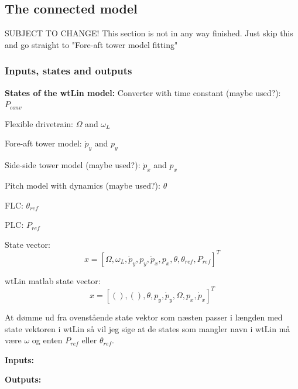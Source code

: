 %	


\subsection{The connected model}
SUBJECT TO CHANGE! This section is not in any way finished. Just skip this and go straight to "Fore-aft tower model fitting"

\subsubsection{Inputs, states and outputs}
\textbf{States of the wtLin model:}
Converter with time constant (maybe used?): $ P_{conv} $

Flexible drivetrain: $ \Omega $ and $ \omega_L $

Fore-aft tower model: $ \dot{p}_y $ and $ p_y $

Side-side tower model (maybe used?): $ \dot{p}_x $ and $ p_x $

Pitch model with dynamics (maybe used?): $ \theta $

FLC: $ \theta_{ref} $

PLC: $ P_{ref} $

State vector: 
\begin{equation}\label{key}
	x = [\Omega, \omega_L, \dot{p}_y, p_y, \dot{p}_x, p_x, \theta, \theta_{ref}, P_{ref}]^T
\end{equation}

wtLin matlab state vector:
\begin{equation}\label{key}
	x = [(), (), \theta, p_y, \dot{p}_y, \Omega, p_x, \dot{p}_x]^T
\end{equation}

At dømme ud fra ovenstående state vektor som næsten passer i længden med state vektoren i wtLin så vil jeg sige at de states som mangler navn i wtLin må være $ \omega $ og enten $ P_{ref} $ eller $ \theta_{ref} $.

\textbf{Inputs:}


\textbf{Outputs:}

